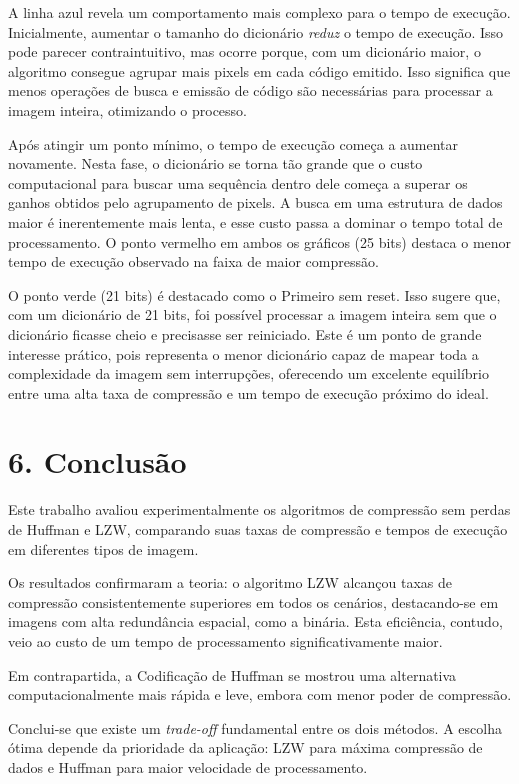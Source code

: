\documentclass{report}
\begin{document}
A linha azul revela um comportamento mais complexo para o tempo de execução. Inicialmente, aumentar o tamanho do dicionário \textit{reduz} o tempo de execução. Isso pode parecer contraintuitivo, mas ocorre porque, com um dicionário maior, o algoritmo consegue agrupar mais pixels em cada código emitido. Isso significa que menos operações de busca e emissão de código são necessárias para processar a imagem inteira, otimizando o processo.

Após atingir um ponto mínimo, o tempo de execução começa a aumentar novamente. Nesta fase, o dicionário se torna tão grande que o custo computacional para buscar uma sequência dentro dele começa a superar os ganhos obtidos pelo agrupamento de pixels. A busca em uma estrutura de dados maior é inerentemente mais lenta, e esse custo passa a dominar o tempo total de processamento. O ponto vermelho em ambos os gráficos (25 bits) destaca o menor tempo de execução observado na faixa de maior compressão.

O ponto verde (21 bits) é destacado como o Primeiro sem reset. Isso sugere que, com um dicionário de 21 bits, foi possível processar a imagem inteira sem que o dicionário ficasse cheio e precisasse ser reiniciado. Este é um ponto de grande interesse prático, pois representa o menor dicionário capaz de mapear toda a complexidade da imagem sem interrupções, oferecendo um excelente equilíbrio entre uma alta taxa de compressão e um tempo de execução próximo do ideal.



\section*{6. Conclusão}
Este trabalho avaliou experimentalmente os algoritmos de compressão sem perdas de Huffman e LZW, comparando suas taxas de compressão e tempos de execução em diferentes tipos de imagem.

Os resultados confirmaram a teoria: o algoritmo LZW alcançou taxas de compressão consistentemente superiores em todos os cenários, destacando-se em imagens com alta redundância espacial, como a binária. Esta eficiência, contudo, veio ao custo de um tempo de processamento significativamente maior.

Em contrapartida, a Codificação de Huffman se mostrou uma alternativa computacionalmente mais rápida e leve, embora com menor poder de compressão.

Conclui-se que existe um \textit{trade-off} fundamental entre os dois métodos. A escolha ótima depende da prioridade da aplicação: LZW para máxima compressão de dados e Huffman para maior velocidade de processamento.



\FloatBarrier

\newpage



\end{document}
